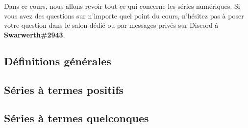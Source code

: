 \noindent Dans ce cours, nous allons revoir tout ce qui concerne les séries numériques. Si vous avez des questions sur n'importe quel point du cours, n'hésitez pas à poser votre question dans le salon dédié ou par messages privés sur Discord à \textbf{Swarwerth\#2943}.

\subsection{Définitions générales}

\clearpage

\subsection{Séries à termes positifs}

\clearpage

\subsection{Séries à termes quelconques}

\clearpage